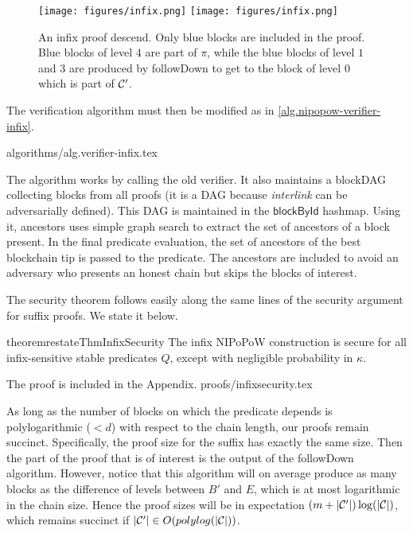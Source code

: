 \begin{figure}[h]
    \caption{An infix proof descend. Only blue blocks are included in the proof.
    Blue blocks of level $4$ are part of $\pi$, while the blue blocks of level
    $1$ and $3$ are produced by followDown to get to the block of level $0$
    which is part of $\mathcal{C}'$.}
    \centering
    \iftwocolumn
        \texttt{[image: figures/infix.png]}
    \else
        \texttt{[image: figures/infix.png]}
    \fi
    \label{fig.infix}
\end{figure}

The verification algorithm must then be modified as in
\ref{alg.nipopow-verifier-infix}.

{algorithms/alg.verifier-infix.tex}

The algorithm works by calling the old verifier. It also maintains a blockDAG
collecting blocks from all proofs (it is a DAG because \textit{interlink} can be
adversarially defined). This DAG is maintained in the $\textsf{blockById}$
hashmap. Using it, \textsf{ancestors} uses simple graph search to extract the
set of ancestors of a block present. In the final predicate evaluation, the set
of ancestors of the best blockchain tip is passed to the predicate. The
ancestors are included to avoid an adversary who presents an honest chain but
skips the blocks of interest.


\medskip

 The security theorem follows easily along
the same lines of the security argument for suffix proofs. We state it below. 
\begin{restatable}{theorem}{restateThmInfixSecurity}
\label{thm.infix-security}
The infix NIPoPoW construction is secure for all infix-sensitive stable
predicates $Q$, except with negligible probability in $\kappa$.
\end{restatable}

The proof is included in the Appendix.
\ifonecolumn
{proofs/infixsecurity.tex}
\fi

As long as the number of blocks on which the predicate depends is
polylogarithmic ($< d$) with respect to the chain length, our proofs remain
succinct. Specifically, the proof size for the suffix has exactly the same size.
Then the part of the proof that is of interest is the output of the followDown
algorithm. However, notice that this algorithm will on average produce as many
blocks as the difference of levels between $B'$ and $E$, which is at most
logarithmic in the chain size. Hence the proof sizes will be in expectation $(m +
|\mathcal{C}'|)\log(|\mathcal{C}|)$, which remains succinct if $|\mathcal{C}'| \in
O(polylog(|\mathcal{C}|))$.
